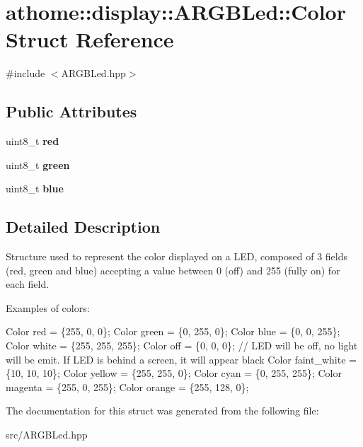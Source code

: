 \hypertarget{structathome_1_1display_1_1_a_r_g_b_led_1_1_color}{}\section{athome\+:\+:display\+:\+:A\+R\+G\+B\+Led\+:\+:Color Struct Reference}
\label{structathome_1_1display_1_1_a_r_g_b_led_1_1_color}


{\ttfamily \#include $<$A\+R\+G\+B\+Led.\+hpp$>$}

\subsection*{Public Attributes}
\begin{DoxyCompactItemize}
\item 
\mbox{\label{structathome_1_1display_1_1_a_r_g_b_led_1_1_color_a38384fe4c2a89f0879ad81ccaa377077}} 
uint8\+\_\+t {\bfseries red}
\item 
\mbox{\label{structathome_1_1display_1_1_a_r_g_b_led_1_1_color_a568646e5c308b5791def48db8f2fe5e1}} 
uint8\+\_\+t {\bfseries green}
\item 
\mbox{\label{structathome_1_1display_1_1_a_r_g_b_led_1_1_color_ae851e58f84fafd51b64c81296ae8dccf}} 
uint8\+\_\+t {\bfseries blue}
\end{DoxyCompactItemize}


\subsection{Detailed Description}
Structure used to represent the color displayed on a L\+ED, composed of 3 fields (red, green and blue) accepting a value between 0 (off) and 255 (fully on) for each field.

Examples of colors\+:


\begin{DoxyCode}
Color red = \{255, 0, 0\};
Color green = \{0, 255, 0\};
Color blue = \{0, 0, 255\};
Color white = \{255, 255, 255\};
Color off = \{0, 0, 0\}; \textcolor{comment}{// LED will be off, no light will be emit. If LED is behind a screen, it will appear
       black}
Color faint\_white = \{10, 10, 10\};
Color yellow = \{255, 255, 0\};
Color cyan = \{0, 255, 255\};
Color magenta = \{255, 0, 255\};
Color orange = \{255, 128, 0\};
\end{DoxyCode}
 

The documentation for this struct was generated from the following file\+:\begin{DoxyCompactItemize}
\item 
src/A\+R\+G\+B\+Led.\+hpp\end{DoxyCompactItemize}
